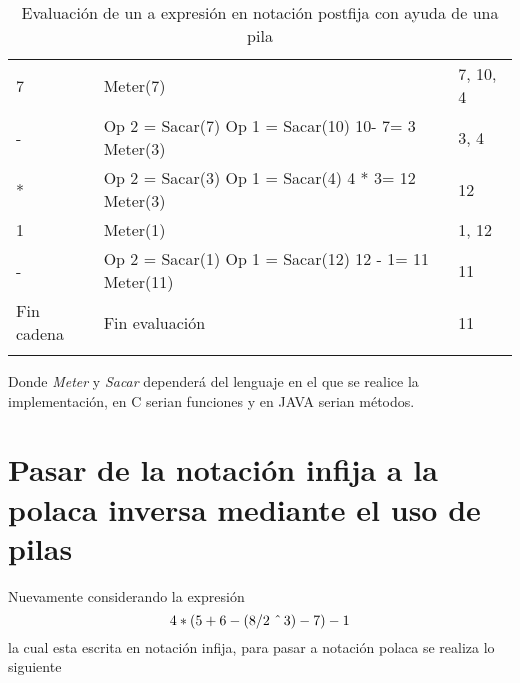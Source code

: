 \documentclass[12pt ]{article}
\begin{document}
\begin{longtable}[h]{p{4cm} p{4cm} p{4cm}}
        7 & Meter(7) & 7, 10, 4 \\

        \rowcolor{gray!20}  - &Op 2 = Sacar(7)\hspace{2 cm} Op 1 = Sacar(10) \hspace{3 cm}  10- 7= 3 \hspace{2 cm} Meter(3) & 3, 4\\

         * &Op 2 = Sacar(3)\hspace{2 cm} Op 1 = Sacar(4) \hspace{3 cm}  4 * 3= 12 \hspace{2 cm} Meter(3) & 12\\


        1 & Meter(1) & 1, 12 \\

        \rowcolor{gray!20}  - &Op 2 = Sacar(1)\hspace{2 cm} Op 1 = Sacar(12) \hspace{3 cm}  12 - 1= 11 \hspace{2 cm} Meter(11) & 11\\



        Fin cadena & Fin evaluación & 11 \\
        \caption{Evaluación de un a expresión en notación postfija con ayuda de una pila}
 \end{longtable}

 Donde \emph{Meter} y \emph{Sacar} dependerá del lenguaje en el que se realice la implementación, en C serian funciones y en JAVA serian métodos.

 \section{Pasar de la notación infija a la      polaca inversa mediante el uso de pilas}

 Nuevamente  considerando la expresión  $$4*(5+6-(8/2\hspace{0.2 cm}\hat{}\hspace{0.15 cm}3)-7)-1$$ la cual esta escrita en notación infija, para pasar a notación polaca se realiza lo siguiente
\end{document}
